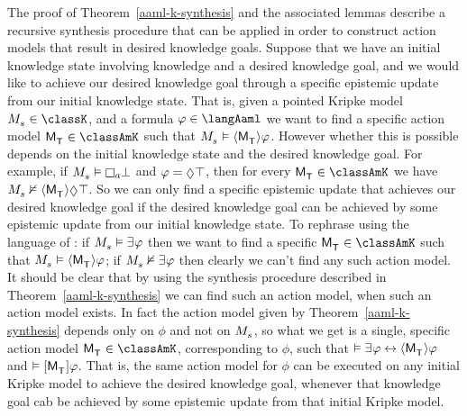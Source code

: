 The proof of Theorem~\ref{aaml-k-synthesis} and the associated lemmas describe a recursive synthesis procedure that can be applied in order to construct action models that result in desired knowledge goals.
Suppose that we have an initial knowledge state involving knowledge and a desired knowledge goal, and we would like to achieve our desired knowledge goal through a specific epistemic update from our initial knowledge state.
That is, given a pointed Kripke model $\kPModel{\kStateS} \in \classK$, and a formula $\phi \in \langAaml$ we want to find a specific action model $\aPModel{\aStatesT} \in \classAmK$ such that $\kPModel{\kStateS} \entails \actionE{\aPModel{\aStatesT}} \phi$.
However whether this is possible depends on the initial knowledge state and the desired knowledge goal.
For example, if $\kPModel{\kStateS} \entails \necessaryA \bot$ and $\phi = \possible \top$, then for every $\aPModel{\aStatesT} \in \classAmK$ we have $\kPModel{\kStateS} \nentails \actionE{\aPModel{\aStatesT}} \possible \top$.
So we can only find a specific epistemic update that achieves our desired knowledge goal if the desired knowledge goal can be achieved by some epistemic update from our initial knowledge state. 
To rephrase using the language of \logicAaml{}: if $\kPModel{\kStateS} \entails \someacts \phi$ then we want to find a specific $\aPModel{\aStatesT} \in \classAmK$ such that $\kPModel{\kStateS} \entails \actionE{\aPModel{\aStatesT}} \phi$; if $\kPModel{\kStateS} \nentails \someacts \phi$ then clearly we can't find any such action model.
It should be clear that by using the synthesis procedure described in Theorem~\ref{aaml-k-synthesis} we can find such an action model, when such an action model exists.
In fact the action model given by Theorem~\ref{aaml-k-synthesis} depends only on $\phi$ and not on $\kPModel{\kStateS}$, so what we get is a single, specific action model $\aPModel{\aStatesT} \in \classAmK$, corresponding to $\phi$, such that $\entails \someacts \phi \iff \actionE{\aPModel{\aStatesT}} \phi$ and $\entails \actionA{\aPModel{\aStatesT}} \phi$.
That is, the same action model for $\phi$ can be executed on any initial Kripke model to achieve the desired knowledge goal, whenever that knowledge goal cab be achieved by some epistemic update from that initial Kripke model.

